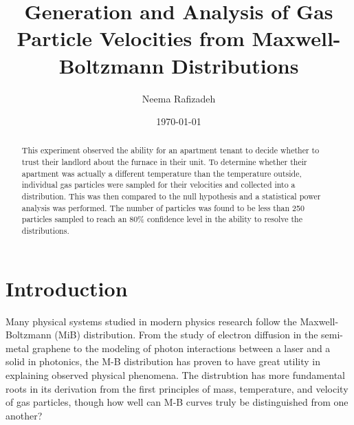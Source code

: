 \documentclass[%
 reprint,
 amsmath,amssymb,
 aps,
]{revtex4-2}
\begin{document}

\title{Generation and Analysis of Gas Particle Velocities from Maxwell-Boltzmann Distributions}%

\author{Neema Rafizadeh}
%

\date{\today}

\begin{abstract}

This experiment observed the ability for an apartment tenant to decide whether to trust their landlord about the furnace in their unit. To determine whether their apartment was actually a different temperature than the temperature outside, individual gas particles were sampled for their velocities and collected into a distribution. This was then compared to the null hypothesis and a statistical power analysis was performed. The number of particles was found to be less than 250 particles sampled to reach an 80\% confidence level in the ability to resolve the distributions. 
\end{abstract}


\maketitle


\section{Introduction \protect\\ }

Many physical systems studied in modern physics research follow the Maxwell-Boltzmann (MiB) distribution. From the study of electron diffusion in the semi-metal graphene to the modeling of photon interactions between a laser and a solid in photonics, the M-B distribution has proven to have great utility in explaining observed physical phenomena. The distrubtion has more fundamental roots in its derivation from the first principles of mass, temperature, and velocity of gas particles, though how well can M-B curves truly be distinguished from one another?  
\end{document}
